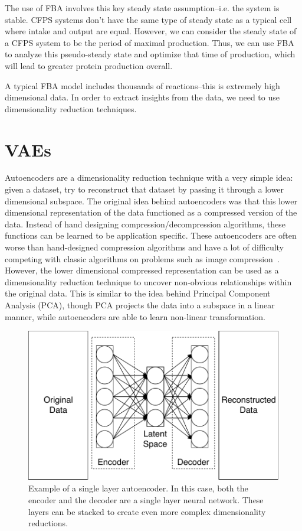 The use of FBA involves this key steady state assumption--i.e. the system is stable.
CFPS systems don't have the same type of steady state as a typical cell where intake and output are equal.
However, we can consider the steady state of a CFPS system to be the period of maximal production.
Thus, we can use FBA to analyze this pseudo-steady state and optimize that time of production, which will lead to greater protein production overall.

A typical FBA model includes thousands of reactions--this is extremely high dimensional data.
In order to extract insights from the data, we need to use dimensionality reduction techniques.

\section{VAEs}
Autoencoders are a dimensionality reduction technique with a very simple idea: given a dataset, try to reconstruct that dataset by passing it through a lower dimensional subspace.
The original idea behind autoencoders was that this lower dimensional representation of the data functioned as a compressed version of the data.
Instead of hand designing compression/decompression algorithms, these functions can be learned to be application specific.
These autoencoders are often worse than hand-designed compression algorithms and have a lot of difficulty competing with classic algorithms on problems such as image compression~\cite{theis2017lossy}.
However, the lower dimensional compressed representation can be used as a dimensionality reduction technique to uncover non-obvious relationships within the original data.
This is similar to the idea behind Principal Component Analysis (PCA), though PCA projects the data into a subspace in a linear manner, while autoencoders are able to learn non-linear transformation.

\begin{figure}[t!]
\begin{center}
\includegraphics{figs/Autoencoder.pdf}
\caption{Example of a single layer autoencoder.
In this case, both the encoder and the decoder are a single layer neural network.
These layers can be stacked to create even more complex dimensionality reductions.}
\end{center}
\label{fig:ae}
\end{figure}

